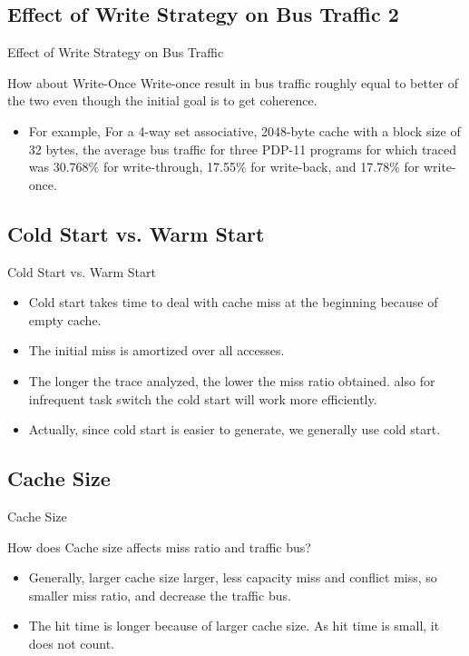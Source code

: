 \documentclass{beamer}
\begin{document}
\subsection{Effect of Write Strategy on Bus Traffic 2}
\begin{frame}{Effect of Write Strategy on Bus Traffic}
	\begin{block}{How about Write-Once}
		Write-once result  in bus traffic roughly equal to better of the two even though the initial goal is to get coherence.
	\end{block}
	\begin{itemize}
		\item{For example, For a 4-way set associative, 2048-byte cache with a block size of 32 bytes, the average bus traffic for three PDP-11 programs for which traced was 30.768\% for write-through, 17.55\% for write-back, and 17.78\% for write-once.}
	\end{itemize}
\end{frame}

\subsection{Cold Start vs. Warm Start}
\begin{frame}{Cold Start vs. Warm Start}
	\begin{itemize}
		\item	{Cold start takes time to deal with cache miss at the beginning because of empty cache.}
		\item  {The initial miss is amortized over all accesses. }
		\item {The longer the trace analyzed, the lower the miss ratio obtained. also for infrequent task switch the cold start will work more efficiently. }
		\item {Actually, since cold start is easier to generate, we generally use cold start.}
	\end{itemize}
\end{frame}

\subsection{Cache Size}
\begin{frame}{Cache Size}
	\begin{block}{How does Cache size affects miss ratio and traffic bus?}
	\end{block}
	\begin{itemize}
		\item {Generally, larger cache size larger, less capacity miss and conflict miss, so smaller miss ratio, and decrease the traffic bus. }
		\item {The hit time is longer because of larger cache size. As hit time is small, it does not count.}	
	\end{itemize}
\end{frame}
\end{document}
